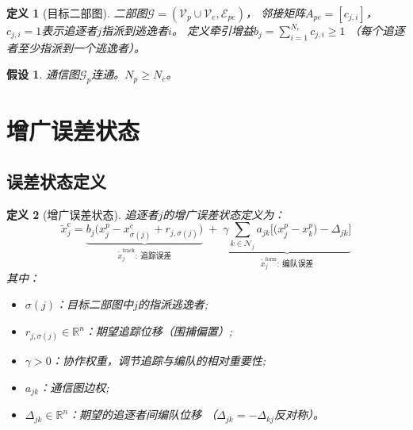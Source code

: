 \documentclass[11pt,a4paper]{article}
\newtheorem{definition}{定义}
\newtheorem{assumption}{假设}
\newcommand{\R}{\mathbb{R}}
\begin{document}
\begin{definition}[目标二部图]\label{def:target_graph}
  二部图$\mathcal{G} = (\mathcal{V}_p \cup \mathcal{V}_e, \mathcal{E}_{pe})$，
  邻接矩阵$A_{pe} = [c_{j,i}]$，$c_{j,i} = 1$表示追逐者$j$指派到逃逸者$i$。
  定义牵引增益$b_j = \sum_{i=1}^{N_e} c_{j,i} \geq 1$
  （每个追逐者至少指派到一个逃逸者）。
\end{definition}

\begin{assumption}\label{asm:graph}
  通信图$\mathcal{G}_p$连通。$N_p \geq N_e$。
\end{assumption}


\section{增广误差状态}

\subsection{误差状态定义}

\begin{definition}[增广误差状态]\label{def:aug_error}
  追逐者$j$的增广误差状态定义为：
  \begin{equation}\label{eq:aug_error}
    \boxed{
    \tilde{x}_j^{\mathrm{c}} =
    \underbrace{b_j \big(x_j^p - x_{\sigma(j)}^e + r_{j,\sigma(j)}\big)}_
      {\displaystyle \tilde{x}_j^{\mathrm{track}}:\ \text{追踪误差}}
    \;+\;
    \underbrace{\gamma \sum_{k \in \mathcal{N}_j}
      a_{jk}\Big[\big(x_j^p - x_k^p\big) - \Delta_{jk}\Big]}_
      {\displaystyle \tilde{x}_j^{\mathrm{form}}:\ \text{编队误差}}
    }
  \end{equation}
  其中：
  \begin{itemize}
    \item $\sigma(j)$：目标二部图中$j$的指派逃逸者;
    \item $r_{j,\sigma(j)} \in \R^n$：期望追踪位移（围捕偏置）;
    \item $\gamma > 0$：协作权重，调节追踪与编队的相对重要性;
    \item $a_{jk}$：通信图边权;
    \item $\Delta_{jk} \in \R^n$：期望的追逐者间编队位移
          （$\Delta_{jk} = -\Delta_{kj}$反对称）。
  \end{itemize}
\end{definition}
\end{document}
